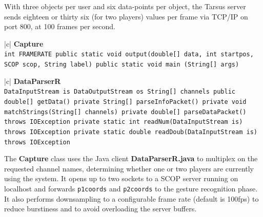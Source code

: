 \documentclass[12pt,a4,notitlepage]{report}
\renewcommand{\_}{\texttt{\symbol{95}}}
\newcommand{\<}{\texttt{\symbol{60}}}
\renewcommand{\>}{\texttt{\symbol{62}}}
\newcommand{\class}[1]{\textbf{#1}}
\newcommand{\scopendpoint}[1]{\texttt{#1}}
\newcommand{\variable}[1]{\texttt{#1}}
\begin{document}
With three objects per user and six data-points per object, the Tarsus server sends eighteen or thirty six (for two players) values per frame via TCP/IP on port 800, at 100 frames per second.

\begin{tabular}{|c|} \hline 
\class{Capture} \\ \hline
{}
{ \variable{int FRAME\_RATE \newline
public static void output(double[] data, int startpos, SCOP scop, String label) \newline
public static void main (String[] args)
} } \\ \hline
\end{tabular}

\begin{tabular}{|c|} \hline 
\class{DataParserR} \\ \hline
{}
{ \variable{DataInputStream is \newline
DataOutputStream os \newline
String[] channels \newline
public double[] getData() \newline
private String[] parseInfoPacket() \newline
private void matchStrings(String[] channels) \newline
private double[] parseDataPacket() throws IOException \newline
private static int readNum(DataInputStream is) throws IOException \newline
private static double readDoub(DataInputStream is) throws IOException
} } \\ \hline
\end{tabular}

The \class{Capture} class uses the Java client \class{DataParserR.java} to multiplex on the requested channel names, determining whether one or two players are currently using the system. It opens up to two sockets to a SCOP server running on localhost and forwards \scopendpoint{p1coords} and \scopendpoint{p2coords} to the gesture recognition phase. It also performs downsampling to a configurable frame rate (default is 100fps) to reduce burstiness and to avoid overloading the server buffers.
\end{document}
